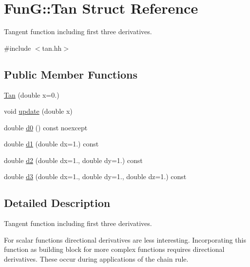 \hypertarget{structFunG_1_1Tan}{\section{\-Fun\-G\-:\-:\-Tan \-Struct \-Reference}
\label{structFunG_1_1Tan}
}


\-Tangent function including first three derivatives.  




{\ttfamily \#include $<$tan.\-hh$>$}

\subsection*{\-Public \-Member \-Functions}
\begin{DoxyCompactItemize}
\item 
\hyperlink{structFunG_1_1Tan_a8dba98f71a80778db0384acefa7684c7}{\-Tan} (double x=0.)
\item 
void \hyperlink{structFunG_1_1Tan_aba1f528723d9e54f873f92bcd968f1fd}{update} (double x)
\item 
double \hyperlink{structFunG_1_1Tan_ad707e21ba717e18d836b08118f4b33be}{d0} () const noexcept
\item 
double \hyperlink{structFunG_1_1Tan_a74556fc11c2f5eaeb39c84bf3b5671e7}{d1} (double dx=1.) const 
\item 
double \hyperlink{structFunG_1_1Tan_a1d133a305b0e72eddc8ef2f675d72557}{d2} (double dx=1., double dy=1.) const 
\item 
double \hyperlink{structFunG_1_1Tan_af5c94edc51602bba744830a7fd96a161}{d3} (double dx=1., double dy=1., double dz=1.) const 
\end{DoxyCompactItemize}


\subsection{\-Detailed \-Description}
\-Tangent function including first three derivatives. 

\-For scalar functions directional derivatives are less interesting. \-Incorporating this function as building block for more complex functions requires directional derivatives. \-These occur during applications of the chain rule. 

